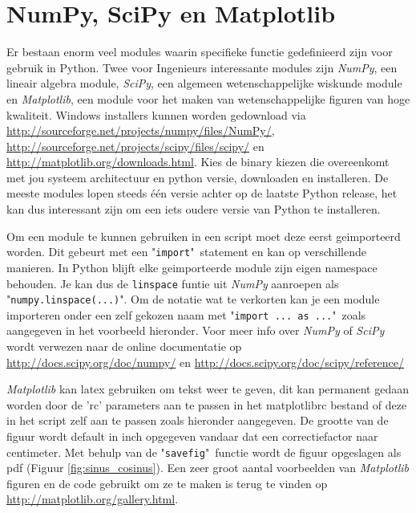 \documentclass[11pt,twoside]{article}
\begin{document}
	\section{NumPy, SciPy en Matplotlib} 
Er bestaan enorm veel modules waarin specifieke functie gedefinieerd zijn voor gebruik in Python. Twee voor Ingenieurs interessante modules zijn \emph{NumPy}, een lineair algebra module, \emph{SciPy}, een algemeen wetenschappelijke wiskunde module en \emph{Matplotlib}, een module voor het maken van wetenschappelijke figuren van hoge kwaliteit. Windows installers kunnen worden gedownload via \url{http://sourceforge.net/projects/numpy/files/NumPy/}, \url{http://sourceforge.net/projects/scipy/files/scipy/} en \url{http://matplotlib.org/downloads.html}. Kies de binary kiezen die overeenkomt met jou systeem architectuur en python versie, downloaden en installeren. De meeste modules lopen steeds één versie achter op de laatste Python release, het kan dus interessant zijn om een iets oudere versie van Python te installeren.

Om een module te kunnen gebruiken in een script moet deze eerst geimporteerd worden. Dit gebeurt met een "\lstinline{import}"\ statement en kan op verschillende manieren. In Python blijft elke geimporteerde module zijn eigen namespace behouden. Je kan dus de \lstinline{linspace} funtie uit \emph{NumPy} aanroepen als "\lstinline{numpy.linspace(...)}". Om de notatie wat te verkorten kan je een module importeren onder een zelf gekozen naam met "\lstinline{import ... as ...}"\ zoals aangegeven in het voorbeeld hieronder. Voor meer info over \emph{NumPy} of \emph{SciPy} wordt verwezen naar de online documentatie op \url{http://docs.scipy.org/doc/numpy/} en \url{http://docs.scipy.org/doc/scipy/reference/}

\emph{Matplotlib} kan latex gebruiken om tekst weer te geven, dit kan permanent gedaan worden door de 'rc' parameters aan te passen in het \textsf{matplotlibrc} bestand of deze in het script zelf aan te passen zoals hieronder aangegeven. De grootte van de figuur wordt default in inch opgegeven vandaar dat een correctiefactor naar centimeter. Met behulp van de "\lstinline{savefig}"\ functie wordt de figuur opgeslagen als pdf (Figuur \ref{fig:sinus_cosinus}). Een zeer groot aantal voorbeelden van \emph{Matplotlib} figuren en de code gebruikt om ze te maken is terug te vinden op \url{http://matplotlib.org/gallery.html}.

\end{document}

